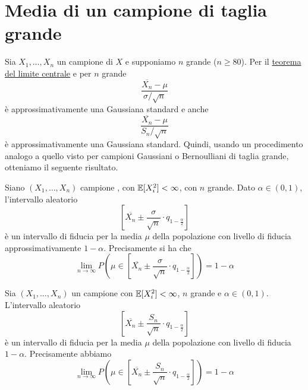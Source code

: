 \section{Media di un campione di taglia grande}
Sia $X_1, \dots, X_n$ un campione \iid di $X$ e supponiamo $n$ grande ($n \geq 80$). Per il
\hyperref[th: tlc]{teorema del limite centrale} e per $n$ grande
\[ \frac{\overline{X_n} - \mu}{\sigma / \sqrt{n}} \]
è approssimativamente una Gaussiana standard e anche
\[ \frac{\overline{X_n} - \mu}{S_n / \sqrt{n}} \]
è approssimativamente una Gaussiana standard. Quindi, usando un procedimento analogo a quello visto
per campioni Gaussiani o Bernoulliani di taglia grande, otteniamo il seguente risultato.

\begin{proposition}
	Siano $(X_1, \dots, X_n)$ campione \iid, con $\mathbb{E}[X_i^2] < \infty$, con $n$ grande. Dato
	$\alpha \in (0,1)$, l'intervallo aleatorio
	\[ \left[ \overline{X_n} \pm \frac{\sigma}{\sqrt{n}} \cdot q_{1 - \frac{\alpha}{2}} \right] \]
	è un intervallo di fiducia per la media $\mu$ della popolazione con livello di fiducia
	approssimativamente $1 - \alpha$. Precisamente si ha che
	\[
		\lim_{n \to \infty} P \left( \mu \in \left[
			\overline{X_n} \pm \frac{\sigma}{\sqrt{n}} \cdot q_{1 - \frac{\alpha}{2}}
			\right] \right) = 1 - \alpha
	\]
\end{proposition}

\begin{proposition}
	Sia $(X_1, \dots, X_n)$ un campione \iid con $\mathbb{E}[X_i^2] < \infty$, $n$ grande e
	$\alpha \in (0,1)$. L'intervallo aleatorio
	\[ \left[ \overline{X_n} \pm \frac{S_n}{\sqrt{n}} \cdot q_{1 - \frac{\alpha}{2}} \right] \]
	è un intervallo di fiducia per la media $\mu$ della popolazione con livello di fiducia
	$1-\alpha$. Precisamente abbiamo
	\[
		\lim_{n \to \infty} P \left( \mu \in \left[
			\overline{X_n} \pm \frac{S_n}{\sqrt{n}} \cdot q_{1 - \frac{\alpha}{2}}
			\right] \right) = 1 - \alpha
	\]
\end{proposition}

